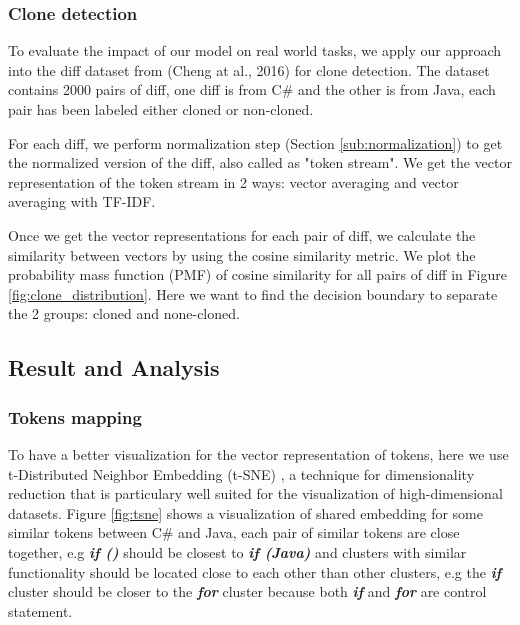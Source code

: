 \subsubsection{Clone detection}
To evaluate the impact of our model on real world tasks, we apply our approach into the diff dataset from (Cheng at al., 2016)\cite{cheng2017clcminer} for clone detection. The dataset contains 2000 pairs of diff, one diff is from C\# and the other is from Java, each pair has been labeled either cloned or non-cloned. 

For each diff, we perform normalization step (Section \ref{sub:normalization}) to get the normalized version of the diff, also called as "token stream". We get the vector representation of the token stream in 2 ways: vector averaging and vector averaging with TF-IDF.

Once we get the vector representations for each pair of diff, we calculate the similarity between vectors by using the cosine similarity metric. We plot the probability mass function (PMF) of cosine similarity for all pairs of diff in Figure \ref{fig:clone_distribution}. Here we want to find the decision boundary to separate the 2 groups: cloned and none-cloned. 





\subsection{Result and Analysis}
\subsubsection{Tokens mapping}
To have a better visualization for the vector representation of tokens, here we use t-Distributed Neighbor Embedding (t-SNE) \cite{maaten2008visualizing}, a technique for dimensionality reduction that is particulary well suited for the visualization of high-dimensional datasets. Figure \ref{fig:tsne} shows a visualization of shared embedding for some similar tokens between C\# and Java, each pair of similar tokens are close together, e.g \textit{\textbf{if ()}} should be closest to \textit{\textbf{if (Java)}} and clusters with similar functionality should be located close to each other than other clusters, e.g the \textit{\textbf{if}} cluster should be closer to the \textit{\textbf{for}} cluster because both \textit{\textbf{if}} and \textit{\textbf{for}} are control statement.



